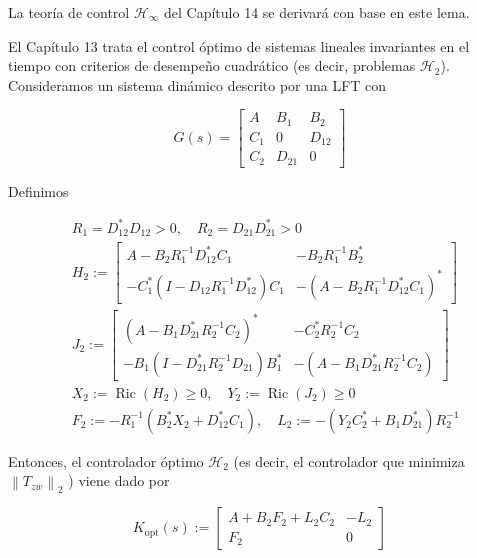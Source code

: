 La teoría de control $\mathcal{H}_{\infty}$ del Capítulo 14 se derivará con base en este lema.

El Capítulo 13 trata el control óptimo de sistemas lineales invariantes en el tiempo con criterios de desempeño cuadrático (es decir, problemas $\mathcal{H}_{2}$). Consideramos un sistema dinámico descrito por una LFT con

$$
G(s)=\left[\begin{array}{c|cc}
A & B_{1} & B_{2} \\
\hline C_{1} & 0 & D_{12} \\
C_{2} & D_{21} & 0
\end{array}\right]
$$


Definimos

$$
\begin{aligned}
& R_{1}=D_{12}^{*} D_{12}>0, \quad R_{2}=D_{21} D_{21}^{*}>0 \\
& H_{2}:=\left[\begin{array}{cc}
A-B_{2} R_{1}^{-1} D_{12}^{*} C_{1} & -B_{2} R_{1}^{-1} B_{2}^{*} \\
-C_{1}^{*}\left(I-D_{12} R_{1}^{-1} D_{12}^{*}\right) C_{1} & -\left(A-B_{2} R_{1}^{-1} D_{12}^{*} C_{1}\right)^{*}
\end{array}\right] \\
& J_{2}:=\left[\begin{array}{cc}
\left(A-B_{1} D_{21}^{*} R_{2}^{-1} C_{2}\right)^{*} & -C_{2}^{*} R_{2}^{-1} C_{2} \\
-B_{1}\left(I-D_{21}^{*} R_{2}^{-1} D_{21}\right) B_{1}^{*} & -\left(A-B_{1} D_{21}^{*} R_{2}^{-1} C_{2}\right)
\end{array}\right] \\
& X_{2}:=\operatorname{Ric}\left(H_{2}\right) \geq 0, \quad Y_{2}:=\operatorname{Ric}\left(J_{2}\right) \geq 0 \\
& F_{2}:=-R_{1}^{-1}\left(B_{2}^{*} X_{2}+D_{12}^{*} C_{1}\right), \quad L_{2}:=-\left(Y_{2} C_{2}^{*}+B_{1} D_{21}^{*}\right) R_{2}^{-1}
\end{aligned}
$$

Entonces, el controlador óptimo $\mathcal{H}_{2}$ (es decir, el controlador que minimiza $\left\|T_{z w}\right\|_{2}$ ) viene dado por

$$
K_{\mathrm{opt}}(s):=\left[\begin{array}{c|c}
A+B_{2} F_{2}+L_{2} C_{2} & -L_{2} \\
\hline F_{2} & 0
\end{array}\right]
$$

